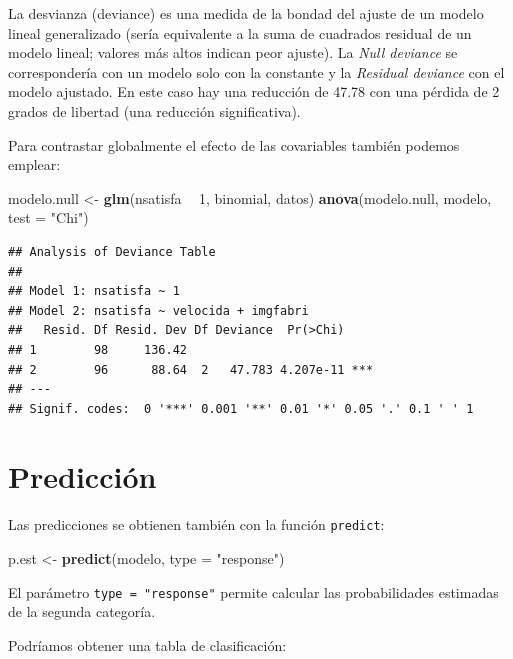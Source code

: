 \documentclass[]{book}
\newenvironment{Shaded}{\begin{snugshade}}{\end{snugshade}}
\newcommand{\KeywordTok}[1]{\textcolor[rgb]{0.13,0.29,0.53}{\textbf{#1}}}
\newcommand{\DataTypeTok}[1]{\textcolor[rgb]{0.13,0.29,0.53}{#1}}
\newcommand{\DecValTok}[1]{\textcolor[rgb]{0.00,0.00,0.81}{#1}}
\newcommand{\StringTok}[1]{\textcolor[rgb]{0.31,0.60,0.02}{#1}}
\newcommand{\OperatorTok}[1]{\textcolor[rgb]{0.81,0.36,0.00}{\textbf{#1}}}
\newcommand{\NormalTok}[1]{#1}
\begin{document}
La desvianza (deviance) es una medida de la bondad del ajuste de un
modelo lineal generalizado (sería equivalente a la suma de cuadrados
residual de un modelo lineal; valores más altos indican peor ajuste). La
\emph{Null deviance} se correspondería con un modelo solo con la
constante y la \emph{Residual deviance} con el modelo ajustado. En este
caso hay una reducción de 47.78 con una pérdida de 2 grados de libertad
(una reducción significativa).

Para contrastar globalmente el efecto de las covariables también podemos
emplear:

\begin{Shaded}
\begin{Highlighting}[]
\NormalTok{modelo.null <-}\StringTok{ }\KeywordTok{glm}\NormalTok{(nsatisfa }\OperatorTok{~}\StringTok{ }\DecValTok{1}\NormalTok{, binomial, datos)}
\KeywordTok{anova}\NormalTok{(modelo.null, modelo, }\DataTypeTok{test =} \StringTok{"Chi"}\NormalTok{)}
\end{Highlighting}
\end{Shaded}

\begin{verbatim}
## Analysis of Deviance Table
## 
## Model 1: nsatisfa ~ 1
## Model 2: nsatisfa ~ velocida + imgfabri
##   Resid. Df Resid. Dev Df Deviance  Pr(>Chi)    
## 1        98     136.42                          
## 2        96      88.64  2   47.783 4.207e-11 ***
## ---
## Signif. codes:  0 '***' 0.001 '**' 0.01 '*' 0.05 '.' 0.1 ' ' 1
\end{verbatim}

\section{Predicción}\label{prediccion-1}

Las predicciones se obtienen también con la función \texttt{predict}:

\begin{Shaded}
\begin{Highlighting}[]
\NormalTok{p.est <-}\StringTok{ }\KeywordTok{predict}\NormalTok{(modelo, }\DataTypeTok{type =} \StringTok{"response"}\NormalTok{)}
\end{Highlighting}
\end{Shaded}

El parámetro \texttt{type\ =\ "response"} permite calcular las
probabilidades estimadas de la segunda categoría.

Podríamos obtener una tabla de clasificación:
\end{document}
